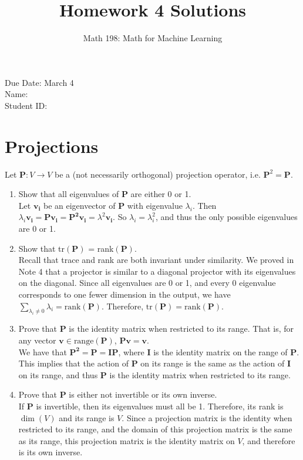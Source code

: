 \documentclass{article}
\title{Homework 4 Solutions}
\author{Math 198: Math for Machine Learning}
\date{}
\begin{document}
\maketitle

\noindent
Due Date: March 4 \\
Name: \\
Student ID:

\section{Projections}
Let $\mathbf{P}: V \to V$ be a (not necessarily orthogonal) projection operator, i.e. $\mathbf{P}^2 = \mathbf{P}$. 
\begin{enumerate}
\item Show that all eigenvalues of $\mathbf{P}$ are either 0 or 1. \\
{\color{blue} Let $\mathbf{v_i}$ be an eigenvector of $\mathbf{P}$ with eigenvalue $\lambda_i$. Then $\lambda_i\mathbf{v_i} = \mathbf{Pv_i} = \mathbf{P^2v_i} = \lambda^2\mathbf{v_i}$. So $\lambda_i = \lambda_i^2$, and thus the only possible eigenvalues are 0 or 1.}
\item Show that tr$(\mathbf{P})$ = rank$(\mathbf{P})$. \\
{\color{blue} Recall that trace and rank are both invariant under similarity. We proved in Note 4 that a projector is similar to a diagonal projector with its eigenvalues on the diagonal. Since all eigenvalues are 0 or 1, and every 0 eigenvalue corresponds to one fewer dimension in the output, we have $
\sum_{\lambda_i \neq 0} \lambda_i = \text{rank}(\mathbf{P})$. Therefore, $\text{tr}(\mathbf{P}) = \text{rank}(\mathbf{P})$.}
\item Prove that $\mathbf{P}$ is the identity matrix when restricted to its range. That is, for any vector $\mathbf{v} \in \text{range}(\mathbf{P})$, $\mathbf{Pv} = \mathbf{v}$. \\
{\color{blue} We have that $\mathbf{P^2} = \mathbf{P} = \mathbf{IP}$, where $\mathbf{I}$ is the identity matrix on the range of $\mathbf{P}$. This implies that the action of $\mathbf{P}$ on its range is the same as the action of $\mathbf{I}$ on its range, and thus $\mathbf{P}$ is the identity matrix when restricted to its range.}
\item Prove that $\mathbf{P}$ is either not invertible or its own inverse. \\
{\color{blue} If $\mathbf{P}$ is invertible, then its eigenvalues must all be 1. Therefore, its rank is $\dim(V)$ and its range is $V$. Since a projection matrix is the identity when restricted to its range, and the domain of this projection matrix is the same as its range, this projection matrix is the identity matrix on $V$, and therefore is its own inverse. }
\end{enumerate}
\end{document}
